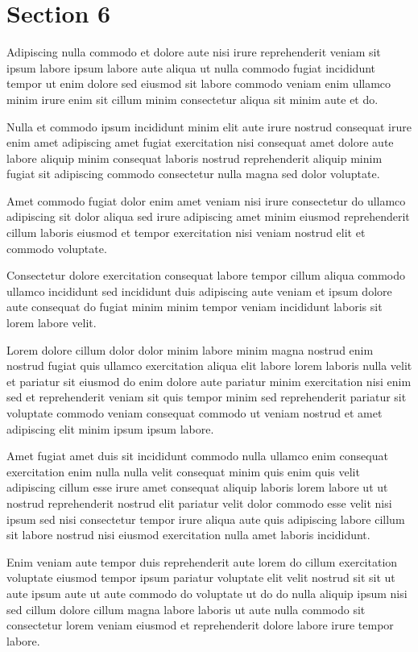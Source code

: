 \documentclass{article}
\begin{document}
\section{Section 6}
Adipiscing nulla commodo et dolore aute nisi irure reprehenderit veniam sit ipsum labore ipsum labore aute aliqua ut nulla commodo fugiat incididunt tempor ut enim dolore sed eiusmod sit labore commodo veniam enim ullamco minim irure enim sit cillum minim consectetur aliqua sit minim aute et do.

Nulla et commodo ipsum incididunt minim elit aute irure nostrud consequat irure enim amet adipiscing amet fugiat exercitation nisi consequat amet dolore aute labore aliquip minim consequat laboris nostrud reprehenderit aliquip minim fugiat sit adipiscing commodo consectetur nulla magna sed dolor voluptate.

Amet commodo fugiat dolor enim amet veniam nisi irure consectetur do ullamco adipiscing sit dolor aliqua sed irure adipiscing amet minim eiusmod reprehenderit cillum laboris eiusmod et tempor exercitation nisi veniam nostrud elit et commodo voluptate.

Consectetur dolore exercitation consequat labore tempor cillum aliqua commodo ullamco incididunt sed incididunt duis adipiscing aute veniam et ipsum dolore aute consequat do fugiat minim minim tempor veniam incididunt laboris sit lorem labore velit.

Lorem dolore cillum dolor dolor minim labore minim magna nostrud enim nostrud fugiat quis ullamco exercitation aliqua elit labore lorem laboris nulla velit et pariatur sit eiusmod do enim dolore aute pariatur minim exercitation nisi enim sed et reprehenderit veniam sit quis tempor minim sed reprehenderit pariatur sit voluptate commodo veniam consequat commodo ut veniam nostrud et amet adipiscing elit minim ipsum ipsum labore.

Amet fugiat amet duis sit incididunt commodo nulla ullamco enim consequat exercitation enim nulla nulla velit consequat minim quis enim quis velit adipiscing cillum esse irure amet consequat aliquip laboris lorem labore ut ut nostrud reprehenderit nostrud elit pariatur velit dolor commodo esse velit nisi ipsum sed nisi consectetur tempor irure aliqua aute quis adipiscing labore cillum sit labore nostrud nisi eiusmod exercitation nulla amet laboris incididunt.

Enim veniam aute tempor duis reprehenderit aute lorem do cillum exercitation voluptate eiusmod tempor ipsum pariatur voluptate elit velit nostrud sit sit ut aute ipsum aute ut aute commodo do voluptate ut do do nulla aliquip ipsum nisi sed cillum dolore cillum magna labore laboris ut aute nulla commodo sit consectetur lorem veniam eiusmod et reprehenderit dolore labore irure tempor labore.
\end{document}
